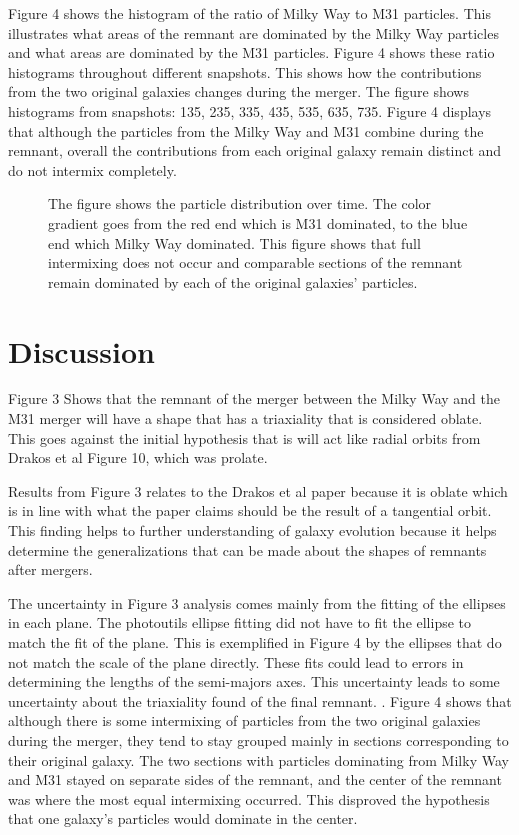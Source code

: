 \documentclass[linenumbers,trackchanges]{aastex7}
\begin{document}
Figure 4 shows the histogram of the ratio of Milky Way to M31 particles. This illustrates what areas of the remnant are dominated by the Milky Way particles and what areas are dominated by the M31 particles. Figure 4 shows these ratio histograms throughout different snapshots. This shows how the contributions from the two original galaxies changes during the merger. The figure shows histograms from snapshots: 135, 235, 335, 435, 535, 635, 735. Figure 4 displays that although the particles from the Milky Way and M31 combine during the remnant, overall the contributions from each original galaxy remain distinct and do not intermix completely. 
\begin{figure}[ht!]
\caption{The figure shows the particle distribution over time. The color gradient goes from the red end which is M31 dominated, to the blue end which Milky Way dominated. This figure shows that full intermixing does not occur and comparable sections of the remnant remain dominated by each of the original galaxies' particles.
\label{fig:general}}
\end{figure}

\section{Discussion} \label{sec:style}
Figure 3 Shows that the remnant of the merger between the Milky Way and the M31 merger will have a shape that has a triaxiality that is considered oblate. This goes against the initial hypothesis that is will act like radial orbits from Drakos et al Figure 10, which was prolate.

Results from Figure 3 relates to the Drakos et al paper because it is oblate which is in line with what the paper claims should be the result of a tangential orbit. This finding helps to further understanding of galaxy evolution because it helps determine the generalizations that can be made about the shapes of remnants after mergers. 

The uncertainty in Figure 3 analysis comes mainly from the fitting of the ellipses in each plane. The photoutils ellipse fitting did not have to fit the ellipse to match the fit of the plane. This is exemplified in Figure 4 by the ellipses that do not match the scale of the plane directly. These fits could lead to errors in determining the lengths of the semi-majors axes. This uncertainty leads to some uncertainty about the triaxiality found of the final remnant. 
.
Figure 4 shows that although there is some intermixing of particles from the two original galaxies during the merger, they tend to stay grouped mainly in sections corresponding to their original galaxy. The two sections with particles dominating from Milky Way and M31 stayed on separate sides of the remnant, and the center of the remnant was where the most equal intermixing occurred. This disproved the hypothesis that one galaxy's particles would dominate in the center. 
\end{document}
